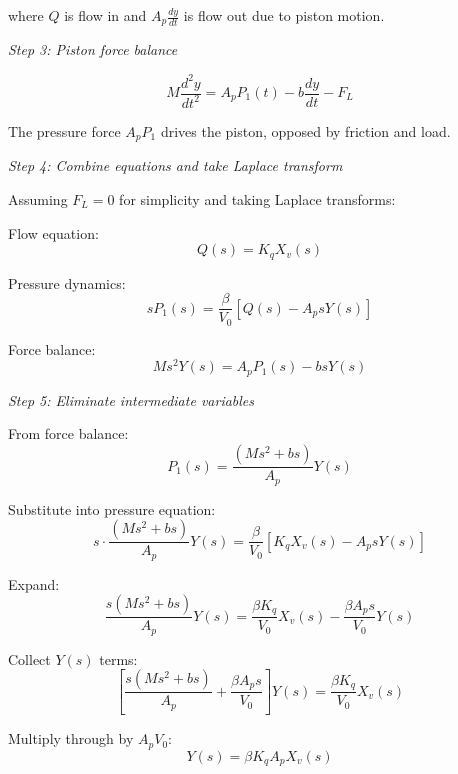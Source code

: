 \begin{example}
where $Q$ is flow in and $A_p\frac{dy}{dt}$ is flow out due to piston motion.

\textit{Step 3: Piston force balance}

\begin{equation}
M\frac{d^2y}{dt^2} = A_p P_1(t) - b\frac{dy}{dt} - F_L
\end{equation}

The pressure force $A_p P_1$ drives the piston, opposed by friction and load.

\textit{Step 4: Combine equations and take Laplace transform}

Assuming $F_L = 0$ for simplicity and taking Laplace transforms:

Flow equation:
\begin{equation}
Q(s) = K_q X_v(s)
\end{equation}

Pressure dynamics:
\begin{equation}
sP_1(s) = \frac{\beta}{V_0}[Q(s) - A_p s Y(s)]
\end{equation}

Force balance:
\begin{equation}
Ms^2 Y(s) = A_p P_1(s) - bs Y(s)
\end{equation}

\textit{Step 5: Eliminate intermediate variables}

From force balance:
\begin{equation}
P_1(s) = \frac{(Ms^2 + bs)}{A_p} Y(s)
\end{equation}

Substitute into pressure equation:
\begin{equation}
s \cdot \frac{(Ms^2 + bs)}{A_p} Y(s) = \frac{\beta}{V_0}[K_q X_v(s) - A_p s Y(s)]
\end{equation}

Expand:
\begin{equation}
\frac{s(Ms^2 + bs)}{A_p} Y(s) = \frac{\beta K_q}{V_0} X_v(s) - \frac{\beta A_p s}{V_0} Y(s)
\end{equation}

Collect $Y(s)$ terms:
\begin{equation}
\left[\frac{s(Ms^2 + bs)}{A_p} + \frac{\beta A_p s}{V_0}\right] Y(s) = \frac{\beta K_q}{V_0} X_v(s)
\end{equation}

Multiply through by $A_p V_0$:
\begin{equation}
[V_0 s(Ms^2 + bs) + \beta A_p^2 s] Y(s) = \beta K_q A_p X_v(s)
\end{equation}


\end{example}
